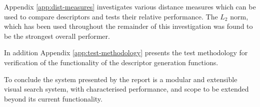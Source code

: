Appendix \ref{app:dist-measures} investigates various distance measures which can be used to compare descriptors and tests their relative performance. The $L_2$ norm, which has been used throughout the remainder of this investigation was found to be the strongest overall performer.

In addition Appendix \ref{app:test-methodology} presents the test methodology for verification of the functionality of the descriptor generation functions.

To conclude the system presented by the report is a modular and extensible visual search system, with characterised performance, and scope to be extended beyond its current functionality. 